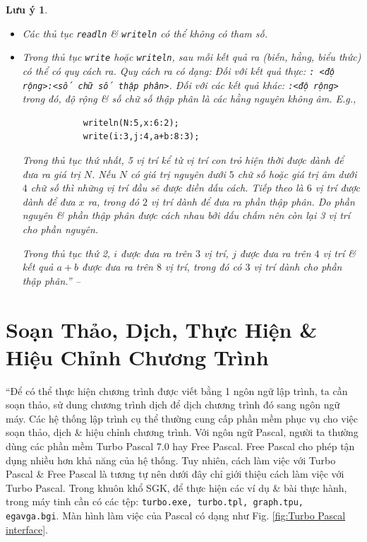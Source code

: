 \documentclass[oneside]{book}
\numberwithin{equation}{section}
\newtheorem{luuy}{Lưu ý}[section]
\begin{document}
\begin{luuy}
	\begin{itemize}
		\item Các thủ tục \texttt{readln} \& \texttt{writeln} có thể không có tham số.
		\item Trong thủ tục \texttt{write} hoặc \texttt{writeln}, sau mỗi kết quả ra (biến, hằng, biểu thức) có thể có \emph{quy cách ra}. Quy cách ra có dạng: Đối với kết quả thực: \verb|: <độ rộng>:<số chữ số thập phân>|. Đối với các kết quả khác: \verb|:<độ rộng>| trong đó, \emph{độ rộng} \& \emph{số chữ số thập phân} là các hằng nguyên không âm. E.g.,
		\begin{verbatim}
			writeln(N:5,x:6:2);
			write(i:3,j:4,a+b:8:3);
		\end{verbatim}
		Trong thủ tục thứ nhất, 5 vị trí kể từ vị trí con trỏ hiện thời được dành để đưa ra giá trị $N$. Nếu $N$ có giá trị nguyên dưới $5$ chữ số hoặc giá trị âm dưới $4$ chữ số thì những vị trí đầu sẽ được điền dấu cách. Tiếp theo là $6$ vị trí được dành để đưa $x$ ra, trong đó $2$ vị trí dành để đưa ra phần thập phân. Do phần nguyên \& phần thập phân được cách nhau bởi dấu chấm nên còn lại 3 vị trí cho phần nguyên.
		
		Trong thủ tục thứ 2, $i$ được đưa ra trên $3$ vị trí, $j$ được đưa ra trên $4$ vị trí \& kết quả $a + b$ được đưa ra trên $8$ vị trí, trong đó có $3$ vị trí dành cho phần thập phân.'' -- \cite[p. 31]{SGK_Tin_Hoc_11}
	\end{itemize}
\end{luuy}


\section{Soạn Thảo, Dịch, Thực Hiện \& Hiệu Chỉnh Chương Trình}
``Để có thể thực hiện chương trình được viết bằng 1 ngôn ngữ lập trình, ta cần soạn thảo, sử dung chương trình dịch để dịch chương trình đó sang ngôn ngữ máy. Các hệ thống lập trình cụ thể thường cung cấp phần mềm phục vụ cho việc soạn thảo, dịch \& hiệu chỉnh chương trình. Với ngôn ngữ Pascal, người ta thường dùng các phần mềm Turbo Pascal 7.0 hay Free Pascal. Free Pascal cho phép tận dụng nhiều hơn khả năng của hệ thống. Tuy nhiên, cách làm việc với Turbo Pascal \& Free Pascal là tương tự nên dưới đây chỉ giới thiệu cách làm việc với Turbo Pascal. Trong khuôn khổ SGK, để thực hiện các ví dụ \& bài thực hành, trong máy tinh cần có các tệp: \texttt{turbo.exe, turbo.tpl, graph.tpu, egavga.bgi}. Màn hình làm việc của Pascal có dạng như Fig. \ref{fig:Turbo Pascal interface}.
\end{document}
